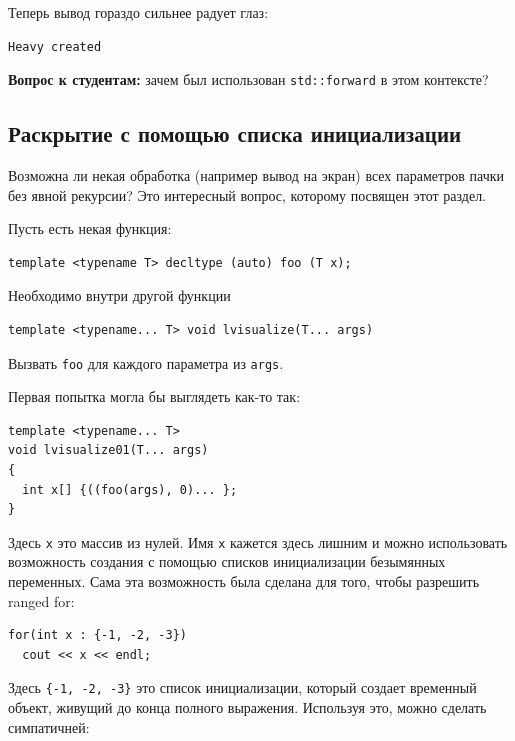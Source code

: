 \documentclass[a4paper,12pt,oneside]{book}
\newif\ifanswers
\begin{document}
Теперь вывод гораздо сильнее радует глаз:

\begin{verbatim}
Heavy created
\end{verbatim}

\textbf{Вопрос к студентам:} зачем был использован \lstinline!std::forward! в этом контексте?

\ifanswers
Ответ: на случай если аргументы конструктора также имеют тяжелые копирующие конструкторы. Обобщённое программирование, что уж тут.
\fi

\subsection{Раскрытие с помощью списка инициализации}\label{ExpandInit}

Возможна ли некая обработка (например вывод на экран) всех параметров пачки без явной рекурсии? Это интересный вопрос, которому посвящен этот раздел.

Пусть есть некая функция:

\begin{lstlisting}
template <typename T> decltype (auto) foo (T x);
\end{lstlisting}

Необходимо внутри другой функции 

\begin{lstlisting}
template <typename... T> void lvisualize(T... args)
\end{lstlisting}

Вызвать \lstinline!foo! для каждого параметра из \lstinline!args!.

Первая попытка могла бы выглядеть как-то так:

\begin{lstlisting}
template <typename... T>
void lvisualize01(T... args)
{
  int x[] {((foo(args), 0)... };
}
\end{lstlisting}

Здесь \lstinline!x! это массив из нулей. Имя \lstinline!x! кажется здесь лишним и можно использовать возможность создания с помощью списков инициализации безымянных переменных. Сама эта возможность была сделана для того, чтобы разрешить ranged for:

\begin{lstlisting}
for(int x : {-1, -2, -3})
  cout << x << endl;
\end{lstlisting}

Здесь \lstinline!{-1, -2, -3}! это список инициализации, который создает временный объект, живущий до конца полного выражения. Используя это, можно сделать симпатичней:
\end{document}
